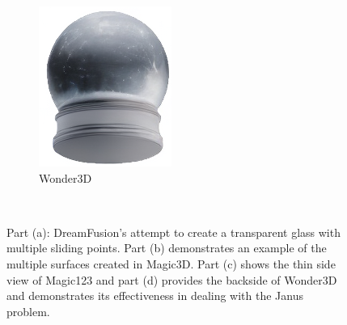 \begin{figure}[ht]
\begin{subfigure}[b]{0.25\textwidth}
        \includegraphics[width=\textwidth]{etc/a detailed rendering of a snow globe containing a snowman/wonder3D/rgb_000_back.png}
        \vspace{0.1cm}
        \caption{Wonder3D}
    \end{subfigure}
    \caption{Part (a): DreamFusion's attempt to create a transparent glass with multiple sliding points. Part (b) demonstrates an example of the multiple surfaces created in Magic3D. Part (c) shows the thin side view of Magic123 and part (d) provides the backside of Wonder3D and demonstrates its effectiveness in dealing with the Janus problem.}~\label{fig:dreamfusionGlobe}
\end{figure}